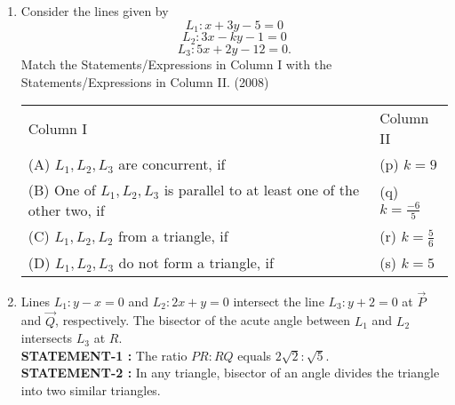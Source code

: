 	\begin{enumerate}
	\item Consider the lines given by
		$$L_1:x+3y-5=0$$ $$L_2:3x-ky-1=0$$ $$L_3:5x+2y-12=0.$$
		Match the Statements/Expressions in {Column I} with the Statements/Expressions in {Column II}. 
		\hfill(2008)
		\begin{tabular}{p{8cm} p{3cm}}
			Column I & Column II \\
			(A) $L_1,L_2,L_3$ are concurrent, if & (p) $k=9$ \\
			(B) One of $L_1,L_2,L_3$ is parallel to at least one of the other two, if & (q) $k=\frac{-6}{5}$ \\
			(C) $L_1,L_2,L_2$ from a triangle, if & (r) $k=\frac{5}{6}$ \\
			(D) $L_1,L_2,L_3$ do not form a triangle, if & (s) $k=5$
		\end{tabular}
\item Lines $L_{1}: y-x=0$ and $L_{2}: 2x+y=0$ intersect the line $L_{3}: y+2=0$ at $\vec{P}$ and $\vec{Q}$, respectively. The bisector of the acute 
angle between $L_{1}$ and $L_{2}$ intersects $L_{3}$ at $R$.\\
\textbf{STATEMENT-1 :} The ratio $PR:RQ$ equals $2\sqrt{2}:\sqrt{5}$.\\
\textbf{STATEMENT-2 :} In any triangle, bisector of an angle divides the triangle into two similar triangles.


\end{enumerate}
